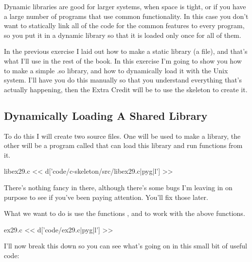 Dynamic libraries are good for larger systems, when space is tight, or if you have
a large number of programs that use common functionality.  In this case you don't
want to statically link all of the code for the common features to every program,
so you put it in a dynamic library so that it is loaded only once for all of them.

In the previous exercise I laid out how to make a static library (a  file),
and that's what I'll use in the rest of the book.  In this exercise I'm going to 
show you how to make a simple .so library, and how to dynamically load it with the
Unix  system.  I'll have you do this manually so that you understand
everything that's actually happening, then the Extra Credit will be to use the
 skeleton to create it.

\subsection{Dynamically Loading A Shared Library}

To do this I will create two source files.  One will be used to make a 
 library, the other will be a program called 
that can load this library and run functions from it.

\begin{code}{libex29.c}
<< d['code/c-skeleton/src/libex29.c|pyg|l'] >>
\end{code}

There's nothing fancy in there, although there's some bugs I'm leaving in
on purpose to see if you've been paying attention.  You'll fix those later.

What we want to do is use the functions ,  and
 to work with the above functions.

\begin{code}{ex29.c}
<< d['code/ex29.c|pyg|l'] >>
\end{code}

I'll now break this down so you can see what's going on in this small bit
of useful code:

